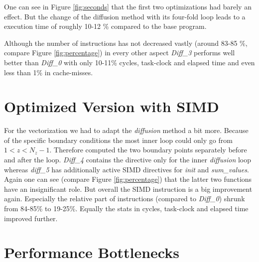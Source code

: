 \documentclass[12pt,a4paper]{article}
\begin{document}
One can see in Figure \ref{fig:seconds} that the first two optimizations had barely an effect. But the change of the diffusion method with its four-fold loop leads to a execution time of roughly 10-12 \% compared to the base program. 

Although the number of instructions has not decreased vastly (around 83-85 \%, compare Figure \ref{fig:percentage}) in every other aspect \emph{Diff\_3} performs well better than \emph{Diff\_0} with only 10-11\% cycles, task-clock and elapsed time and even less than 1\% in cache-misses. 

\section{Optimized Version with SIMD}

For the vectorization we had to adapt the \emph{diffusion} method a bit more. Because of the specific boundary conditions the most inner loop could only go from $ 1 < z < N_z - 1 $. Therefore computed the two boundary points separately before and after the loop. \emph{Diff\_4} contains the directive only for the inner \emph{diffusion} loop whereas \emph{diff\_5} has additionally active SIMD directives for \emph{init} and \emph{sum\_values}. Again one can see (compare Figure \ref{fig:percentage}) that the latter two functions have an insignificant role. But overall the SIMD instruction is a big improvement again. Especially the relative part of instructions (compared to \emph{Diff\_0}) shrunk from 84-85\% to 19-25\%. Equally the stats in cycles, task-clock and elapsed time improved further. 

\section{Performance Bottlenecks}
\end{document}
